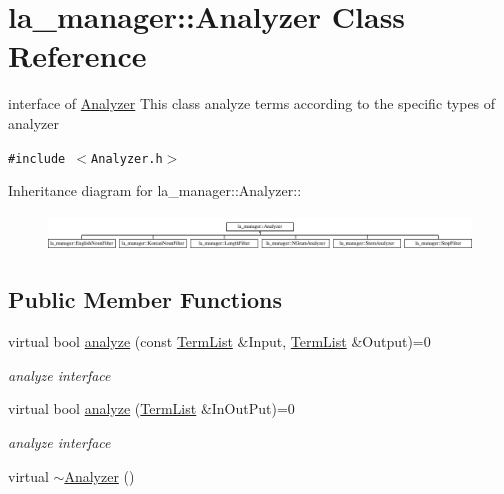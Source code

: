 \hypertarget{classla__manager_1_1Analyzer}{
\section{la\_\-manager::Analyzer Class Reference}
\label{classla__manager_1_1Analyzer}
}
interface of \hyperlink{classla__manager_1_1Analyzer}{Analyzer} This class analyze terms according to the specific types of analyzer  


{\tt \#include $<$Analyzer.h$>$}

Inheritance diagram for la\_\-manager::Analyzer::\begin{figure}[H]
\begin{center}
\leavevmode
\includegraphics[height=0.972222cm]{classla__manager_1_1Analyzer}
\end{center}
\end{figure}
\subsection*{Public Member Functions}
\begin{CompactItemize}
\item 
virtual bool \hyperlink{classla__manager_1_1Analyzer_a096ba4b2faeaa0f3938d7b826ab1c78}{analyze} (const \hyperlink{namespacela__manager_06c0aab93982ee3ebc3ef9d0419e619a}{TermList} \&Input, \hyperlink{namespacela__manager_06c0aab93982ee3ebc3ef9d0419e619a}{TermList} \&Output)=0
\begin{CompactList}\small\item\em analyze interface \item\end{CompactList}\item 
virtual bool \hyperlink{classla__manager_1_1Analyzer_23414b773ec2070957e9aa3d6a7d8b78}{analyze} (\hyperlink{namespacela__manager_06c0aab93982ee3ebc3ef9d0419e619a}{TermList} \&InOutPut)=0
\begin{CompactList}\small\item\em analyze interface \item\end{CompactList}\item 
virtual \hyperlink{classla__manager_1_1Analyzer_2dff111165f053298d3887806ef172ec}{$\sim$Analyzer} ()
\end{CompactItemize}


